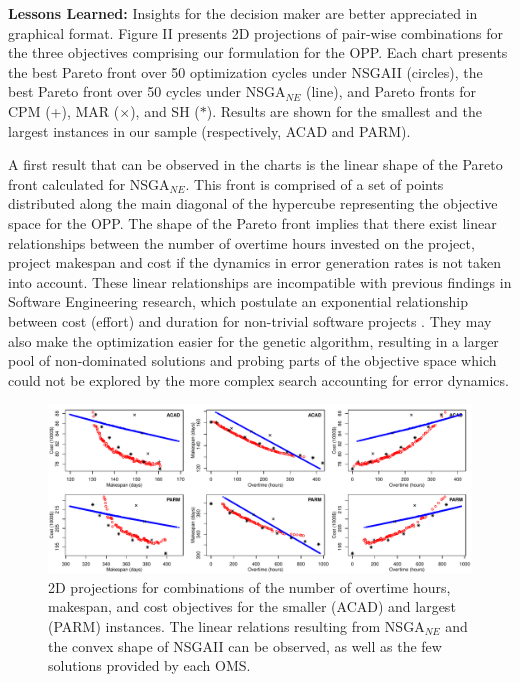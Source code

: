 \documentclass[conference]{IEEEtran}
\begin{document}
\vspace{3px}
\noindent
\textbf{Lessons Learned:} Insights for the decision maker are better appreciated in graphical format. Figure II presents 2D projections of pair-wise combinations for the three objectives comprising our formulation for the OPP. Each chart presents the best Pareto front over 50 optimization cycles under NSGAII (circles), the best Pareto front over 50 cycles under NSGA$_{NE}$ (line), and Pareto fronts for CPM (+), MAR ($\times$), and SH ($\ast$). Results are shown for the smallest and the largest instances in our sample (respectively, ACAD and PARM).

A first result that can be observed in the charts is the linear shape of the Pareto front calculated for NSGA$_{NE}$. This front is comprised of a set of points distributed along the main diagonal of the hypercube representing the objective space for the OPP. The shape of the Pareto front implies that there exist linear relationships between the number of overtime hours invested on the project, project makespan and cost if the dynamics in error generation rates is not taken into account. These linear relationships are incompatible with previous findings in Software Engineering research, which postulate an exponential relationship between cost (effort) and duration for non-trivial software projects \cite{Boehm:1981}. They may also make the optimization easier for the genetic algorithm, resulting in a larger pool of non-dominated solutions and probing parts of the objective space which could not be explored by the more complex search accounting for error dynamics.

\begin{figure}
\centering
\includegraphics[scale=0.65]{2dplots.pdf}
\caption{2D projections for combinations of the number of overtime hours, makespan, and cost objectives for the smaller (ACAD) and largest (PARM) instances. The linear relations resulting from NSGA$_{NE}$ and the convex shape of NSGAII can be observed, as well as the few solutions provided by each OMS.}
\end{figure}
\end{document}
